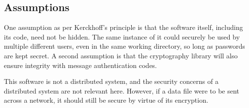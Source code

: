 \documentclass[12pt, letterpaper]{article}
\begin{document}
\subsection{Assumptions}
One assumption as per Kerckhoff's principle is that the software itself, including its code, need not be hidden. The same instance of it could securely be used by multiple different users, even in the same working directory, so long as passwords are kept secret. A second assumption is that the cryptography library will also ensure integrity with message authentication codes.

This software is not a distributed system, and the security concerns of a distributed system are not relevant here. However, if a data file were to be sent across a network, it should still be secure by virtue of its encryption.
\end{document}
